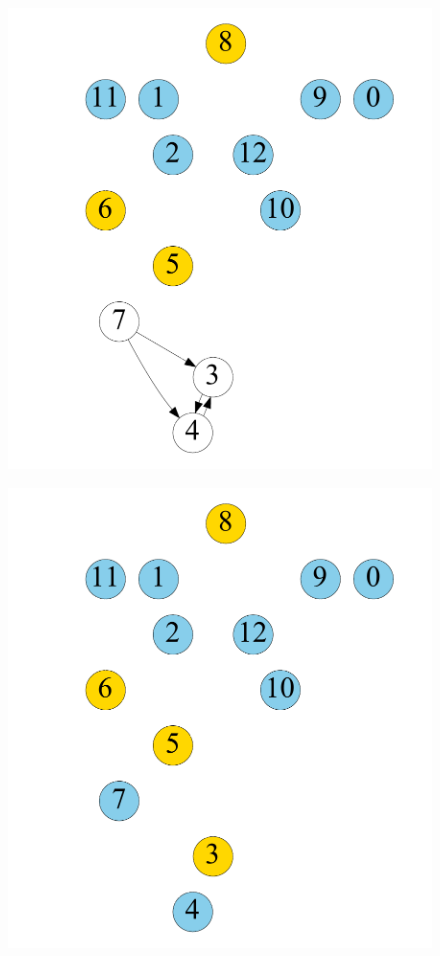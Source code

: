 \begin{figure}[t]
\begin{minipage}[b]{0.19\linewidth}
	\end{minipage}
	\begin{minipage}[b]{0.19\linewidth}
		\centering
		{\includegraphics[width=\textwidth]{./alg_fig/simple-g6}}
	\end{minipage}                  
	\begin{minipage}[b]{0.19\linewidth}
		\centering
		{\includegraphics[width=\textwidth]{./alg_fig/simple-g8}}

\end{minipage}
\end{figure}
